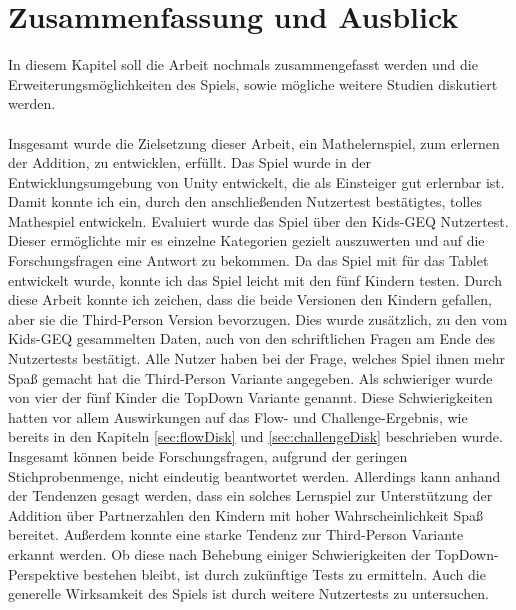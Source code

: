 \section{Zusammenfassung und Ausblick}
\label{sec:ausblickDisk}
In diesem Kapitel soll die Arbeit nochmals zusammengefasst werden und die Erweiterungsmöglichkeiten des Spiels, sowie mögliche weitere Studien diskutiert werden.\\
\\
Insgesamt wurde die Zielsetzung dieser Arbeit, ein Mathelernspiel, zum erlernen der Addition, zu entwicklen, erfüllt. Das Spiel wurde in der Entwicklungsumgebung von Unity entwickelt, die als Einsteiger gut erlernbar ist. Damit konnte ich ein, durch den anschließenden Nutzertest bestätigtes, tolles Mathespiel entwickeln. Evaluiert wurde das Spiel über den Kids-GEQ Nutzertest. Dieser ermöglichte mir es einzelne Kategorien gezielt auszuwerten und auf die Forschungsfragen eine Antwort zu bekommen. Da das Spiel mit für das Tablet entwickelt wurde, konnte ich das Spiel leicht mit den fünf Kindern testen. Durch diese Arbeit konnte ich zeichen, dass die beide Versionen den Kindern gefallen, aber sie die Third-Person Version bevorzugen. Dies wurde zusätzlich, zu den vom Kids-GEQ gesammelten Daten, auch von den schriftlichen Fragen am Ende des Nutzertests bestätigt. Alle Nutzer haben bei der Frage, welches Spiel ihnen mehr Spaß gemacht hat die Third-Person Variante angegeben. Als schwieriger wurde von vier der fünf Kinder die TopDown Variante genannt. Diese Schwierigkeiten hatten vor allem Auswirkungen auf das Flow- und Challenge-Ergebnis, wie bereits in den Kapiteln \ref{sec:flowDisk} und \ref{sec:challengeDisk} beschrieben wurde.\\
Insgesamt können beide Forschungsfragen, aufgrund der geringen Stichprobenmenge, nicht eindeutig beantwortet werden. Allerdings kann anhand der Tendenzen gesagt werden, dass ein solches Lernspiel zur Unterstützung der Addition über Partnerzahlen den Kindern mit hoher Wahrscheinlichkeit Spaß bereitet. Außerdem konnte eine starke Tendenz zur Third-Person Variante erkannt werden. Ob diese nach Behebung einiger Schwierigkeiten der TopDown-Perspektive bestehen bleibt, ist durch zukünftige Tests zu ermitteln. Auch die generelle Wirksamkeit des Spiels ist durch weitere Nutzertests zu untersuchen.\\
\\

